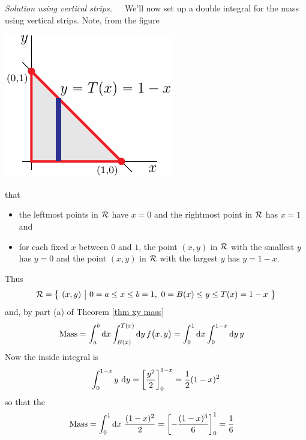 \begin{eg}
\medskip\noindent\emph{Solution using vertical strips.}\ \ \
We'll now set up a double integral for the mass using vertical strips.  
Note, from the figure 
\begin{efig}
\begin{center}
   \includegraphics{dblInt0b.pdf}
\end{center}
\end{efig}
that
\begin{itemize}
\item
the leftmost points in $\mathcal{R}$ have $x=0$ and the rightmost point
in $\mathcal{R}$ has $x=1$ and
\item 
for each fixed $x$ between $0$ and $1$, the point $(x,y)$ in $\mathcal{R}$
with the smallest $y$ has $y=0$ and the point $(x,y)$ in $\mathcal{R}$
with the largest $y$ has $y=1-x$.
\end{itemize}
Thus
\begin{equation*}
\cR=\Set{(x,y)}{0=a\le x\le b=1,\ 
        0= B(x)\le y\le T(x) = 1-x}
\end{equation*}
and, by part (a) of Theorem  \ref{thm xy mass}
\begin{align*}
\text{Mass} &= \int_a^b \mathrm{d}x \int_{B(x)}^{T(x)} \mathrm{d}y\, f\big(x,y\big) 
        = \int_0^1 \mathrm{d}x \int_0^{1-x} \mathrm{d}y\, y 
\end{align*}
Now the inside integral is
\begin{align*}
\int_0^{1-x}  y \ \mathrm{d}y
=\left[ \frac{y^2}{2} \right]_0^{1-x}
=\frac{1}{2}(1-x)^2
\end{align*}
so that the
\begin{align*}
\text{Mass} &= \int_0^1 \mathrm{d}x\  \frac{(1-x)^2}{2}
        =\left[-\frac{(1-x)^3}{6}\right]_0^1 
        = \frac{1}{6}
\end{align*} 



\end{eg}
